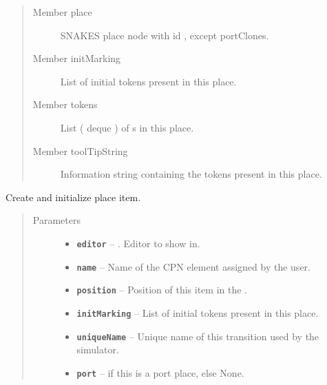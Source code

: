 \documentclass[a4paper,10pt,english]{sphinxmanual}
\begin{document}
\begin{fulllineitems}
\begin{quote}
\begin{description}
\item[{Member place}] \leavevmode
SNAKES place node with id , except portClones.

\item[{Member initMarking}] \leavevmode
List of initial tokens present in this place.

\item[{Member tokens}] \leavevmode
List ( deque ) of  s in this place.

\item[{Member toolTipString}] \leavevmode
Information string containing the tokens present in this place.

\end{description}\end{quote}

\begin{fulllineitems}
\label{model_link:model.PlaceItem.PlaceItem.__init__}
Create and initialize place item.
\begin{quote}\begin{description}
\item[{Parameters}] \leavevmode\begin{itemize}
\item {} 
\textbf{\texttt{editor}} -- . Editor to show in.

\item {} 
\textbf{\texttt{name}} -- Name of the CPN element assigned by the user.

\item {} 
\textbf{\texttt{position}} -- Position of this item in the .

\item {} 
\textbf{\texttt{initMarking}} -- List of initial tokens present in this place.

\item {} 
\textbf{\texttt{uniqueName}} -- Unique name of this transition used by the simulator.

\item {} 
\textbf{\texttt{port}} --  if this is a port place, else None.


\end{itemize}
\end{description}
\end{quote}
\end{fulllineitems}
\end{fulllineitems}
\end{document}
